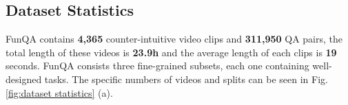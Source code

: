 \subsection{Dataset Statistics}
FunQA contains \textbf{4,365} counter-intuitive video clips and \textbf{311,950} QA pairs, the total length of these videos is \textbf{23.9h} and the average length of each clips is \textbf{19} seconds. FunQA consists three fine-grained subsets, each one containing well-designed tasks. The specific numbers of videos and splits can be seen in Fig. \ref{fig:dataset statistics} (a).
